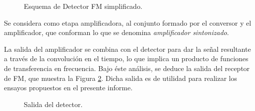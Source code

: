 \begin{figure}[H]
  \centering
    \caption{Esquema de Detector FM simplificado.}
    \label{fig:ReceptorSimplificado}
\end{figure}

Se considera como etapa amplificadora, al conjunto formado por el conversor 
y el amplificador, que conforman lo que se denomina \textit{amplificador sintonizado}.

La salida del amplificador se combina con el detector para dar la señal resultante 
a través de la convolución en el tiempo, lo que implica un producto de funciones 
de transferencia en frecuencia. Bajo éste análisis, se deduce la salida del 
receptor de FM, que muestra la Figura \ref{fig:FdeTReceptor}. Dicha salida es de 
utilidad para realizar los ensayos propuestos en el presente informe.

\begin{figure}[H]
  \centering
    \caption{Salida del detector.}
    \label{fig:FdeTReceptor}
\end{figure}

